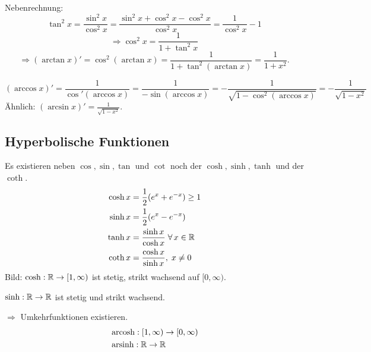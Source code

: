 \documentclass[../ana2.tex]{subfiles}
\begin{document}
Nebenrechnung:
\[ \tan^2 x = \frac{\sin^2 x}{\cos^2 x} 
= \frac{\sin^2 x + \cos^2 x - \cos^2 x}{\cos^2 x}
= \frac{1}{\cos^2 x} - 1 \]
\[ \Rightarrow \cos^2 x = \frac{1}{1 + \tan^2 x} \]
\[ \Rightarrow (\arctan x)' = \cos^2(\arctan x) 
= \frac{1}{1 + \tan^2(\arctan x)} = \frac{1}{1 + x^2}. \]

\[ (\arccos x)' = \frac{1}{\cos'(\arccos x)} 
= \frac{1}{-\sin(\arccos x)}
= -\frac{1}{\sqrt{1-\cos^2 (\arccos x)}} 
= -\frac{1}{\sqrt{1-x^2}} \]
Ähnlich: \( (\arcsin x)' = \frac{1}{\sqrt{1 - x^2}} \).
\subsection*{Hyperbolische Funktionen}
Es existieren neben \( \cos, \sin, \tan \) und \( \cot \) 
noch der \( \cosh, \sinh, \tanh \) und der \( \coth \).
\begin{align*}
    \cosh x &= \frac{1}{2} (e^x + e^{-x}) \geq 1\\
    \sinh x &= \frac{1}{2}(e^x-e^{-x}) \\
    \tanh x &= \frac{\sinh x}{\cosh x} \;\forall x\in\R \\
    \coth x &= \frac{\cosh x}{\sinh x}, \;x \neq 0
\end{align*}
Bild:
\( \abb{\cosh}{\R}{[1,\infty)} \) ist stetig, 
strikt wachsend auf \( [0,\infty) \).
\begin{tikzpicture}

\end{tikzpicture}
\( \abb{\sinh}{\R}{\R} \) ist stetig und strikt
wachsend.
\begin{tikzpicture}
    
\end{tikzpicture}
\( \Rightarrow \) Umkehrfunktionen existieren.
\begin{align*}
    &\abb{\arcosh}{[1, \infty)}{[0, \infty)} \\
    &\abb{\arsinh}{\R}{\R}
\end{align*}
\end{document}
